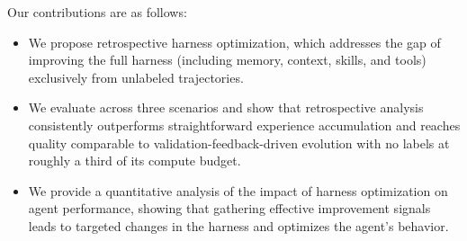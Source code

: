  Our contributions are as follows:
\begin{itemize}[label=$\diamond$]
    \item We propose retrospective harness optimization, which addresses the gap of improving the full harness (including memory, context, skills, and tools) exclusively from unlabeled trajectories.
    \item We evaluate \method{} across three scenarios and show that retrospective analysis consistently outperforms straightforward experience accumulation and reaches quality comparable to validation-feedback-driven evolution with no labels at roughly a third of its compute budget.
    \item We provide a quantitative analysis of the impact of harness optimization on agent performance, showing that gathering effective improvement signals leads to targeted changes in the harness and optimizes the agent's behavior.
\end{itemize}
